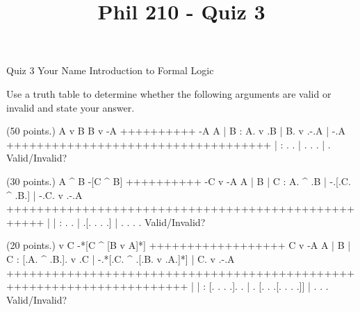 
\title{Phil 210 - Quiz 3}

\heading
Quiz 3
Your Name
Introduction to Formal Logic
\endheading

Use a truth table to determine whether the following arguments are valid or invalid and state your answer.

\problems
{} (50 points.)
\argument
 A v B
 B v -A
++++++++++
 -A
\endargument
        \answer
        \truthtable
         A | B : A. v .B | B. v .-.A | -.A
        +++++++++++++++++++++++++++++++++++
           |   :  .   .  |  .   . .  |  . 
        \endtruthtable
        Valid/Invalid?
        \endanswer

 (30 points.)
\argument
 A ^ B
 -[C ^ B]
++++++++++
 -C v -A
\endargument
        \answer
        \truthtable
         A | B | C : A. ^ .B | -.[.C. ^ .B.] | -.C. v .-.A
        +++++++++++++++++++++++++++++++++++++++++++++++++++
           |   |   :  .   .  |  .[. .   . .] |  . .   . . 
        \endtruthtable
        Valid/Invalid?
        \endanswer

 (20 points.)
\argument
 [A ^ -B] v C
 -*[C ^ [B v A]*]
++++++++++++++++++
 C v -A
\endargument
        \answer
        \truthtable
         A | B | C : [.A. ^ .B.]. v .C | -.*[.C. ^ .[.B. v .A.]*] | C. v .-.A 
        ++++++++++++++++++++++++++++++++++++++++++++++++++++++++++++++++++++++
           |   |   : [. .   . .].   .  |  . [. .   .[. .   . .]]  |  .   . . 
        \endtruthtable
        Valid/Invalid?
        \endanswer

\endproblems
\bye

